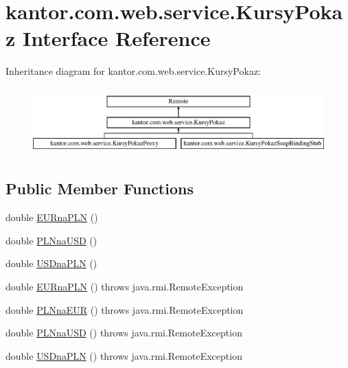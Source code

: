 \hypertarget{classkantor_1_1com_1_1web_1_1service_1_1_kursy_pokaz}{\section{kantor.\+com.\+web.\+service.\+Kursy\+Pokaz Interface Reference}
\label{classkantor_1_1com_1_1web_1_1service_1_1_kursy_pokaz}
}
Inheritance diagram for kantor.\+com.\+web.\+service.\+Kursy\+Pokaz\+:\begin{figure}[H]
\begin{center}
\leavevmode
\includegraphics[height=2.608696cm]{classkantor_1_1com_1_1web_1_1service_1_1_kursy_pokaz}
\end{center}
\end{figure}
\subsection*{Public Member Functions}
\begin{DoxyCompactItemize}
\item 
double \hyperlink{classkantor_1_1com_1_1web_1_1service_1_1_kursy_pokaz_a31eef9def09b0841facda085644ede65}{E\+U\+Rna\+P\+L\+N} ()
\item 
double \hyperlink{classkantor_1_1com_1_1web_1_1service_1_1_kursy_pokaz_a26efb7c3127847ac0bd6adf865c4b891}{P\+L\+Nna\+U\+S\+D} ()
\item 
double \hyperlink{classkantor_1_1com_1_1web_1_1service_1_1_kursy_pokaz_a2c8884d959ed13948edc408b94083b95}{U\+S\+Dna\+P\+L\+N} ()
\item 
double \hyperlink{classkantor_1_1com_1_1web_1_1service_1_1_kursy_pokaz_a31eef9def09b0841facda085644ede65}{E\+U\+Rna\+P\+L\+N} ()  throws java.\+rmi.\+Remote\+Exception
\item 
double \hyperlink{classkantor_1_1com_1_1web_1_1service_1_1_kursy_pokaz_a758e416bdc0cdec7848747c2ceb5818e}{P\+L\+Nna\+E\+U\+R} ()  throws java.\+rmi.\+Remote\+Exception
\item 
double \hyperlink{classkantor_1_1com_1_1web_1_1service_1_1_kursy_pokaz_a26efb7c3127847ac0bd6adf865c4b891}{P\+L\+Nna\+U\+S\+D} ()  throws java.\+rmi.\+Remote\+Exception
\item 
double \hyperlink{classkantor_1_1com_1_1web_1_1service_1_1_kursy_pokaz_a2c8884d959ed13948edc408b94083b95}{U\+S\+Dna\+P\+L\+N} ()  throws java.\+rmi.\+Remote\+Exception
\end{DoxyCompactItemize}


